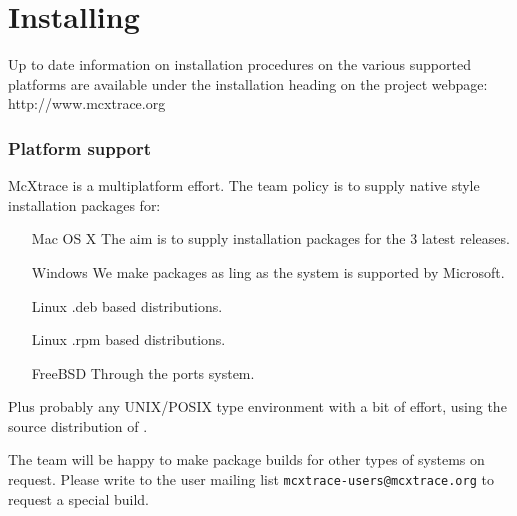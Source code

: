 \chapter{Installing \MCX}
\label{c:install}
Up to date information on installation procedures on the various supported
platforms are available under the installation heading on the \MCX project
webpage: http://www.mcxtrace.org

\subsection{Platform support}
McXtrace is a multiplatform effort. The team policy is to supply native style installation packages
for:
\begin{itemize}
  \item[Mac OS X] The aim is to supply installation packages for the 3 latest releases.
  \item[Windows] We make packages as ling as the system is supported by Microsoft.
  \item[Linux] .deb based distributions.
  \item[Linux] .rpm based distributions.
  \item[FreeBSD] Through the ports system.
\end{itemize}
Plus probably any UNIX/POSIX type environment with a bit of effort, using the source distribution of \MCX.

The team will be happy to make package builds for other types of systems on
request. Please write to the user mailing list
\texttt{mcxtrace-users@mcxtrace.org} to request a special build.

